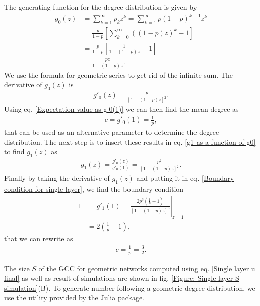 \documentclass[
11pt, %
english, %
singlespacing, %
nolistspacing, %
liststotoc, %
headsepline, %
]{MastersDoctoralThesis} %
\begin{document}
The generating function for the degree distribution is given by
\begin{align}
	g_0(z) &= \sum_{k = 1}^\infty p_k z^k = \sum_{k=1}^\infty p (1-p)^{k-1} z^k \\
		&= \frac{p}{1 - p} \left[ \sum_{k = 0}^\infty \left((1-p) z\right)^k - 1\right] \\
		&= \frac{p}{1 - p} \left[\frac{1}{1 - (1 - p)z} - 1 \right]\\
		&= \frac{p z}{1 - (1 - p)z}. \label{g0 for exponential}
\end{align}
We use the formula for geometric series to get rid of the infinite sum. The derivative of $g_0(z)$ is
\begin{align}
	g'_0(z) = \frac{p}{\left[1 - (1 - p)z\right]^2}.
\end{align}
Using eq. \eqref{Expectation value as g'0(1)} we can then find the mean degree as
\begin{align}
	c = g'_0(1) = \frac{1}{p},
\end{align}
that can be used as an alternative parameter to determine the degree distribution. The next step is to insert these results in eq. \eqref{g1 as a function of g0} to find $g_1(z)$ as
\begin{align}
	g_1(z) = \frac{g'_0(z)}{g'_0(1)} = \frac{p^2}{\left[1 - (1 - p)z\right]^2}. \label{g1 for exponential}
\end{align}
Finally by taking the derivative of $g_1(z)$ and putting it in eq. \eqref{Boundary condition for single layer}, we find the boundary condition
\begin{align}
	1 &= g'_1(1) = \left. \frac{2 p^3 \left(\frac{1}{p} - 1\right)}{\left[1 - (1 - p)z\right]^3}\right\rvert_{z = 1} \\
		&= 2 \left(\frac{1}{p} - 1\right),
\end{align}
that we can rewrite as
\begin{align}
	c = \frac{1}{p} = \frac{3}{2}.
\end{align}

The size $S$ of the GCC for geometric networks computed using eq. \eqref{Single layer u final} as well as result of simulations are shown in fig. \ref{Figure: Single layer S simulation}(B). To generate number following a geometric degree distribution, we use the utility provided by the  Julia package.
\end{document}
